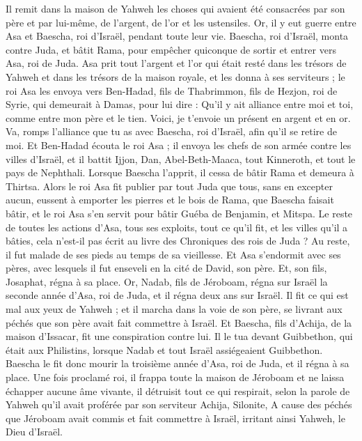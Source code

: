 \begin{multicols}{2}
Il remit dans la maison de Yahweh les choses qui avaient été consacrées par son père et par lui-même, de l'argent, de l'or et les ustensiles.
Or, il y eut guerre entre Asa et Baescha, roi d'Israël, pendant toute leur vie.
Baescha, roi d'Israël, monta contre Juda, et bâtit Rama, pour empêcher quiconque de sortir et entrer vers Asa, roi de Juda.
Asa prit tout l'argent et l'or qui était resté dans les trésors de Yahweh et dans les trésors de la maison royale, et les donna à ses serviteurs ; le roi Asa les envoya vers Ben-Hadad, fils de Thabrimmon, fils de Hezjon, roi de Syrie, qui demeurait à Damas, pour lui dire :
Qu’il y ait alliance entre moi et toi, comme entre mon père et le tien. Voici, je t'envoie un présent en argent et en or. Va, romps l'alliance que tu as avec Baescha, roi d'Israël, afin qu'il se retire de moi.
Et Ben-Hadad écouta le roi Asa ; il envoya les chefs de son armée contre les villes d'Israël, et il battit Ijjon, Dan, Abel-Beth-Maaca, tout Kinneroth, et tout le pays de Nephthali.
Lorsque Baescha l’apprit, il cessa de bâtir Rama et demeura à Thirtsa.
Alors le roi Asa fit publier par tout Juda que tous, sans en excepter aucun, eussent à emporter les pierres et le bois de Rama, que Baescha faisait bâtir, et le roi Asa s’en servit pour bâtir Guéba de Benjamin, et Mitspa.
Le reste de toutes les actions d'Asa, tous ses exploits, tout ce qu'il fit, et les villes qu'il a bâties, cela n'est-il pas écrit au livre des Chroniques des rois de Juda ? Au reste, il fut malade de ses pieds au temps de sa vieillesse.
Et Asa s'endormit avec ses pères, avec lesquels il fut enseveli en la cité de David, son père. Et, son fils, Josaphat, régna à sa place.
Or, Nadab, fils de Jéroboam, régna sur Israël la seconde année d'Asa, roi de Juda, et il régna deux ans sur Israël.
Il fit ce qui est mal aux yeux de Yahweh ; et il marcha dans la voie de son père, se livrant aux péchés que son père avait fait commettre à Israël.
Et Baescha, fils d'Achija, de la maison d'Issacar, fit une conspiration contre lui. Il le tua devant Guibbethon, qui était aux Philistins, lorsque Nadab et tout Israël assiégeaient Guibbethon.
Baescha le fit donc mourir la troisième année d'Asa, roi de Juda, et il régna à sa place.
Une fois proclamé roi, il frappa toute la maison de Jéroboam et ne laissa échapper aucune âme vivante, il détruisit tout ce qui respirait, selon la parole de Yahweh qu'il avait proférée par son serviteur Achija, Silonite,
A cause des péchés que Jéroboam avait commis et fait commettre à Israël, irritant ainsi Yahweh, le Dieu d'Israël.

\end{multicols}
